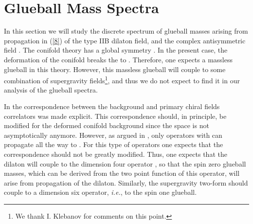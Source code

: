 \documentclass[12pt,epsf,a4paper]{article}
\begin{document}


\section{Glueball Mass Spectra}
  
In this section we will study the discrete spectrum of glueball masses
arising from propagation in (\ref{8}) of the type IIB dilaton field, and the complex antisymmetric 
field \coordHE{}. The \coordHE{} conifold theory has a \coordHE{} global 
symmetry \cite{KT}. In the present case, the deformation of the conifold breaks the 
\coordHE{} to \coordHE{}. Therefore, one expects a massless glueball in this theory. However, 
this massless glueball will couple to some combination of supergravity fields\footnote{We 
thank I. Klebanov for comments on this point.}, and thus we do not expect to find it in our 
analysis of the glueball spectra.
  
In \cite{GKP,Witten1} the correspondence between the \coordHE{} background and primary chiral fields correlators was made explicit. 
This correspondence should, in principle, be modified for the deformed conifold background 
since the space is not asymptotically \coordHE{} anymore. However, as argued in \cite{KS}, 
only operators with \coordHE{} can propagate all the way to 
\coordHE{}. For this type of operators one expects that the correspondence should 
not be greatly modified. Thus, one expects that the dilaton will couple to the 
dimension four operator \coordHE{}, so that the spin zero glueball masses, which can be derived 
from the two point function of this operator, will arise from propagation of the dilaton. 
Similarly, the supergravity two-form should couple to a dimension six  
operator, {\it i.e.}, to the spin one glueball.
\end{document}
